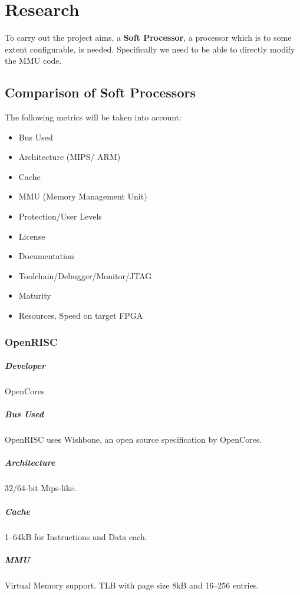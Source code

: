 \chapter{Research}

To carry out the project aims, a \textbf{Soft Processor}, a processor which is to some extent configurable, is needed. Specifically we need to be able to directly modify the MMU code.

\section{Comparison of Soft Processors}
The following metrics will be taken into account:
\begin{itemize}
\item Bus Used
\item Architecture (MIPS/ ARM)
\item Cache
\item MMU (Memory Management Unit)
\item Protection/User Levels
\item License
\item Documentation
\item Toolchain/Debugger/Monitor/JTAG
\item Maturity
\item Resources, Speed on target FPGA
\end{itemize}

\subsection{OpenRISC}
\paragraph{Developer} OpenCores
\paragraph{Bus Used} OpenRISC uses Wishbone, an open source specification by OpenCores.
\paragraph{Architecture} 32/64-bit Mips-like.
\paragraph{Cache} 1--64kB for Instructions and Data each.
\paragraph{MMU} Virtual Memory support. TLB with page size 8kB and 16--256 entries.
